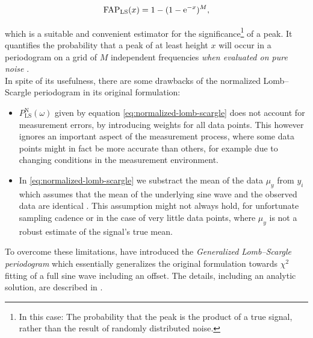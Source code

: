 \begin{equation}
\text{FAP}_{\text{LS}}(x) = 1 - (1 - \mathrm{e}^{-x})^M,
\end{equation}

which is a suitable and convenient estimator for the significance\footnote{In this case: The probability that the peak is the product of a true signal, rather than the result of randomly distributed noise.} of a peak. It quantifies the probability that a peak of at least height $x$ will occur in a periodogram on a grid of $M$ independent frequencies \emph{when evaluated on pure noise} \citep{horne1986}.\\

In spite of its usefulness, there are some drawbacks of the normalized Lomb--Scargle periodogram in its original formulation:

\begin{itemize}
\item $P^{\text{N}}_{\text{LS}}(\omega)$ given by equation \eqref{eq:normalized-lomb-scargle} does not account for measurement errors, \eg by introducing weights for all data points. This however ignores an important aspect of the measurement process, where some data points might in fact be more accurate than others, for example due to changing conditions in the measurement environment.
\item In \eqref{eq:normalized-lomb-scargle} we substract the mean of the data $\mu_y$ from $y_i$ which assumes that the mean of the underlying sine wave and the observed data are identical \citep{cumming1999}. This assumption might not always hold, \eg for unfortunate sampling cadence or in the case of very little data points, where $\mu_y$ is not a robust estimate of the signal's true mean.
\end{itemize}

To overcome these limitations, \citeauthor{zechmeister2009} have introduced the \emph{Generalized Lomb--Scargle periodogram} which essentially generalizes the original formulation towards $\chi^2$ fitting of a full sine wave including an offset. The details, including an analytic solution, are described in \citet{zechmeister2009}.




